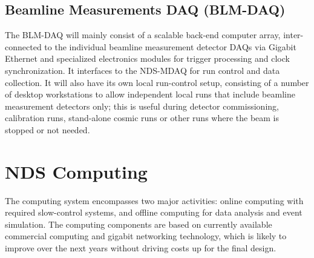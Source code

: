 \subsection{Beamline Measurements DAQ (BLM-DAQ)}

The BLM-DAQ will mainly consist of a scalable back-end 
computer array, inter-connected to the individual beamline measurement detector DAQs via 
Gigabit Ethernet and specialized electronics modules for trigger processing and clock 
synchronization. 
It interfaces to the NDS-MDAQ for run control and 
data collection. It will also have its own local run-control setup, consisting of a number 
of desktop workstations to allow independent local runs that include beamline measurement 
detectors only; this is useful during detector commissioning, calibration runs, stand-alone cosmic 
runs or other runs where the beam is stopped or not needed.


\section{NDS Computing}
\label{sec:nd-gdaq-global-computing}

The computing system encompasses two major activities: online computing with required 
slow-control systems, and offline computing for data analysis and event simulation.
The computing components are based 
on currently available commercial computing and gigabit networking technology, which is 
likely to improve over the next years without driving costs up for the final design.  

